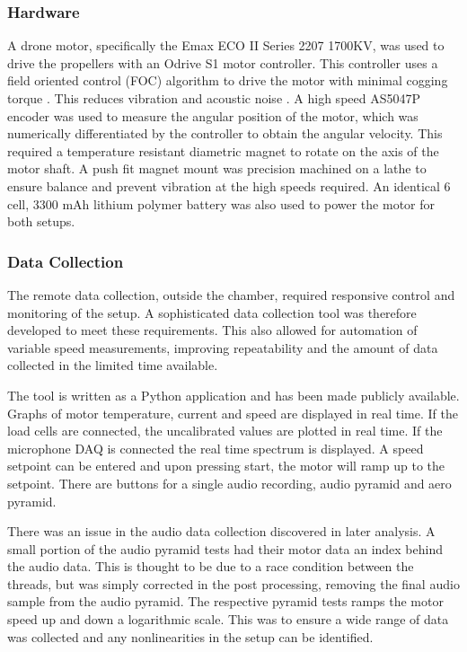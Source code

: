 \documentclass[12pt,a4paper]{article}
\begin{document}
\subsubsection{Hardware}
A drone motor, specifically the Emax ECO II Series 2207 1700KV, was used to drive the propellers with an Odrive S1 motor controller.
This controller uses a field oriented control (FOC) algorithm to drive the motor with minimal cogging torque \cite{en13102534}.
This reduces vibration and acoustic noise \cite{motor_vibration}.
A high speed AS5047P encoder was used to measure the angular position of the motor, which was numerically differentiated by the controller to obtain the angular velocity.
This required a temperature resistant diametric magnet to rotate on the axis of the motor shaft.
A push fit magnet mount was precision machined on a lathe to ensure balance and prevent vibration at the high speeds required.
An identical 6 cell, 3300 mAh lithium polymer battery was also used to power the motor for both setups.

\subsubsection{Data Collection}

The remote data collection, outside the chamber, required responsive control and monitoring of the setup.
A sophisticated data collection tool was therefore developed to meet these requirements.
This also allowed for automation of variable speed measurements, improving repeatability and the amount of data collected in the limited time available.

The tool is written as a Python application and has been made publicly available.
Graphs of motor temperature, current and speed are displayed in real time.
If the load cells are connected, the uncalibrated values are plotted in real time.
If the microphone DAQ is connected the real time spectrum is displayed.
A speed setpoint can be entered and upon pressing start, the motor will ramp up to the setpoint.
There are buttons for a single audio recording, audio pyramid and aero pyramid.

There was an issue in the audio data collection discovered in later analysis.
A small portion of the audio pyramid tests had their motor data an index behind the audio data.
This is thought to be due to a race condition between the threads, but was simply corrected in the post processing,
removing the final audio sample from the audio pyramid.
The respective pyramid tests ramps the motor speed up and down a logarithmic scale.
This was to ensure a wide range of data was collected and any nonlinearities in the setup can be identified.
\end{document}
